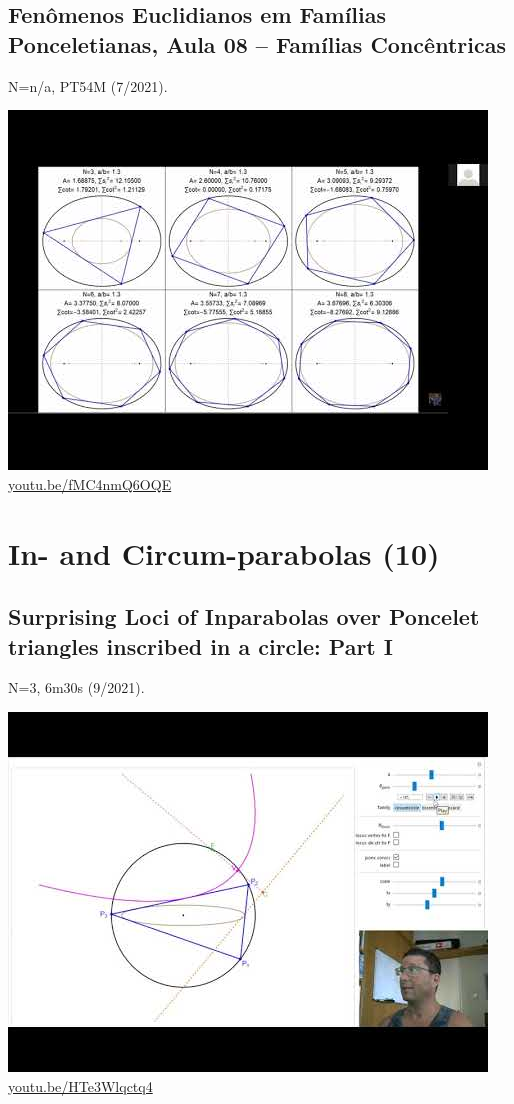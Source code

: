 \documentclass[12pt]{amsart}
\begin{document}
\subsection{Fenômenos Euclidianos em Famílias Ponceletianas, Aula 08 -- Famílias Concêntricas}
\label{vid:fMC4nmQ6OQE}
\noindent N=n/a, PT54M (7/2021). 
\begin{center}\includegraphics[width=.5\textwidth]{pics/fMC4nmQ6OQE.jpg} \\ 
\href{https://youtu.be/fMC4nmQ6OQE}{\url{youtu.be/fMC4nmQ6OQE}}\end{center}
% 

\section{In- and Circum-parabolas (10)}

\subsection{Surprising Loci of Inparabolas over Poncelet triangles inscribed in a circle: Part I}
\label{vid:HTe3Wlqctq4}
\noindent N=3, 6m30s (9/2021). 
\begin{center}\includegraphics[width=.5\textwidth]{pics/HTe3Wlqctq4.jpg} \\ 
\href{https://youtu.be/HTe3Wlqctq4}{\url{youtu.be/HTe3Wlqctq4}}\end{center}
% 
\end{document}
